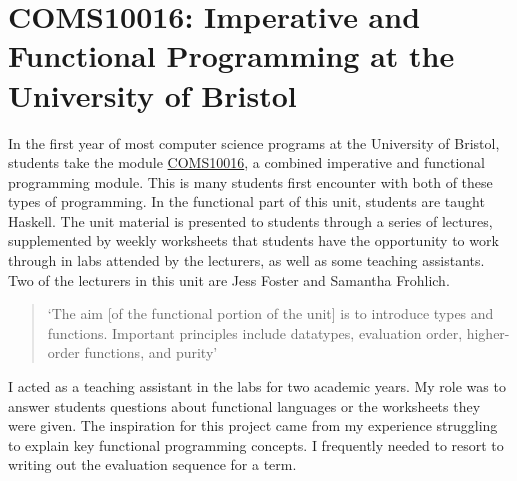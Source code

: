 




\section{COMS10016: Imperative and Functional Programming at the University of Bristol}
\label{COMS10016}
In the first year of most computer science programs at the University of Bristol, students take the module \href{https://www.bristol.ac.uk/unit-programme-catalogue/UnitDetails.jsa?unitCode=COMS10016}{COMS10016}, a combined imperative and functional programming module. This is many students first encounter with both of these types of programming. In the functional part of this unit, students are taught Haskell. The unit material is presented to students through a series of lectures, supplemented by weekly worksheets that students have the opportunity to work through in labs attended by the lecturers, as well as some teaching assistants. Two of the lecturers in this unit are Jess Foster and Samantha Frohlich. 

\begin{quote}
`The aim [of the functional portion of the unit] is to introduce types and functions. Important principles include datatypes, evaluation order, higher-order functions, and purity' \cite{COMS10016}
\end{quote}

\noindent I acted as a teaching assistant in the labs for two academic years. My role was to answer students questions about functional languages or the worksheets they were given. The inspiration for this project came from my experience struggling to explain key functional programming concepts. I frequently needed to resort to writing out the evaluation sequence for a term.